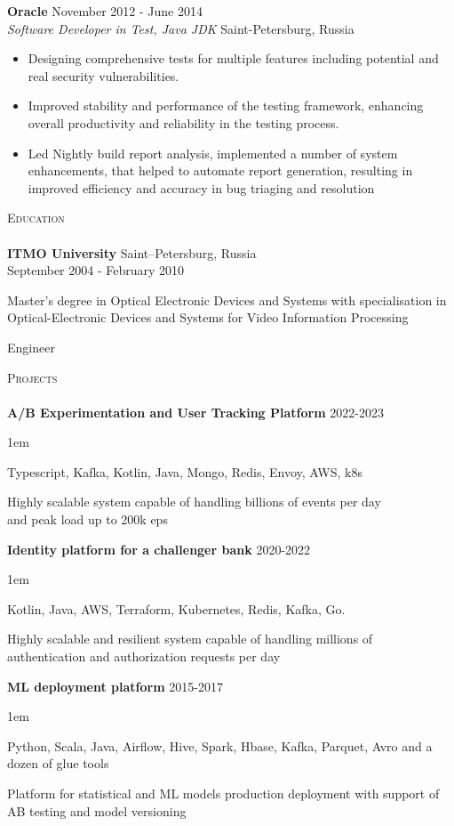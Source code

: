 \documentclass[a4paper]{article}
\newcommand{\lineunder} {
    \vspace*{-8pt} \\
    \hspace*{-18pt} \hrulefill \\
}
\newcommand{\header} [1] {
        {\hspace*{-18pt}\vspace*{6pt} \textsc{#1}}
    \vspace*{-6pt} \lineunder
}
\newcommand{\employer} [4] {
    \textbf{#1} \hfill {#3} \\
    \textit{#2} \hfill {#4} \\
    \vspace{0mm}
}
\newcommand{\education} [5] {
    \textbf{#1} \hfill {#4} \\ {#5}
    \begin{description}[leftmargin=13mm,labelindent=0mm,itemsep=-1mm]
        \item[Degree:] {#2}
        \item[Qualification:] {#3}
    \end{description}
    \vspace{2mm}
}
\newcommand{\project} [4] {
    \textbf{#1} \hfill {#4} \\ \vspace{1mm}
    \begin{addmargin}[1em]{1em}
        \begin{description}[leftmargin=2cm,labelindent=0mm,itemsep=-1mm]
            \item[Tools:] {#2}
            \item[Description:] {#3}
        \end{description}
    \end{addmargin}
    \vspace{2mm}
}
\begin{document}
    \employer{Oracle}{Software Developer in Test, Java JDK}{November 2012 - June 2014}{Saint-Petersburg, Russia}
    \begin{itemize}[itemsep=-1mm]
        \item Designing comprehensive tests for multiple features including potential and real security vulnerabilities.
        \item Improved stability and performance of the testing framework, enhancing overall productivity and reliability
        in the testing process.
        \item Led Nightly build report analysis, implemented a number of system enhancements, that helped to automate report
        generation, resulting in improved efficiency and accuracy in bug triaging and resolution
    \end{itemize}


    \header{Education}

    \education{ITMO University}
    {Master’s degree in Optical Electronic Devices and Systems with specialisation in Optical-Electronic Devices and Systems for Video Information Processing}
    {Engineer}
    {Saint–Petersburg, Russia}
    {September 2004 - February 2010}


    \header{Projects}
    \project{A/B Experimentation and User Tracking Platform}
    {Typescript, Kafka, Kotlin, Java, Mongo, Redis, Envoy, AWS, k8s}
    {Highly scalable system capable of handling billions of events per day \\ and peak load up to 200k eps}
    {2022-2023}

    \project{Identity platform for a challenger bank}
    {Kotlin, Java, AWS, Terraform, Kubernetes, Redis, Kafka, Go.}
    {Highly scalable and resilient system capable of handling millions of authentication and authorization requests per day}
    {2020-2022}

    \project{ML deployment platform}
    {Python, Scala, Java, Airflow, Hive, Spark, Hbase, Kafka, Parquet, Avro and a dozen of glue tools}
    {Platform for statistical and ML models production deployment with support of AB testing and model versioning}
    {2015-2017}
\end{document}
